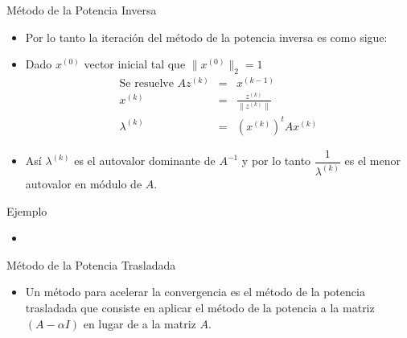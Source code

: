 \documentclass[11pt]{beamer}
\begin{document}
  \begin{frame}{M\'etodo de la Potencia Inversa}
    \begin{itemize}
      \item Por lo tanto la iteraci\'on del m\'etodo de la potencia inversa es como sigue:
      \item<2-> Dado $x^{(0)}$ vector inicial tal que $\|x^{(0)}\|_2 = 1$
      \begin{eqnarray}
         \mbox{Se resuelve } Az^{(k)} & = & x^{(k-1)}\nonumber\\
         x^{(k)} & = & \frac{z^{(k)}}{\|z^{(k)}\|}\nonumber\\
         \lambda^{(k)} & = & (x^{(k)})^tAx^{(k)}\nonumber
      \end{eqnarray}
      \item<3-> As\'i $\lambda^{(k)}$ es el autovalor dominante de $A^{-1}$ y por lo tanto 
      $\dfrac{1}{\lambda^{(k)}}$ es el menor autovalor en m\'odulo de $A$.      
    \end{itemize}
  \end{frame}
  \begin{frame}{Ejemplo}
    \begin{itemize}
      \item
    \end{itemize}
    \end{frame}
  \begin{frame}{M\'etodo de la Potencia Trasladada}
    \begin{itemize}
      \item<1-> Un m\'etodo para acelerar la convergencia es el m\'etodo de la potencia trasladada que consiste en aplicar el m\'etodo de la potencia a la matriz $(A - \alpha I)$ en lugar de a la matriz $A$.
    \end{itemize} 
  \end{frame}
\end{document}
